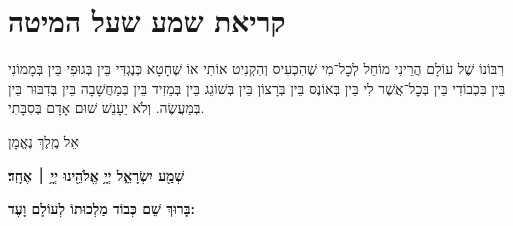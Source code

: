 \vspace{0.25in}
\chapter[ק״ש שעל המיטה]{ קריאת שמע שעל המיטה }

רִבּוֹנוֹ שֶׁל עוֹלָם הֲרֵינִי מוֹחֵל לְכׇל־מִי שֶׁהִכְעִיס וְהִקְנִיט אוֹתִי אוֹ שֶׁחָטָא כְּנֶגְדִּי בֵּין בְּגוּפִי בֵּין בְּמָמוֹנִי בֵּין בִּכְבוֹדִי בֵּין בְּכׇל־אֲשֶׁר לִי בֵּין בְּאוֹנֶס בֵּין בְּרָצוֹן בֵּין בְּשׁוֹגֵג בֵּין בְּמֵזִיד בֵּין בְּמַחֲשָׁבָה בֵּין בְּדִבּוּר בֵּין בְּמַעֲשֶׂה. וְלֹא יֵעָנֵשׁ שׁוּם אָדָם בְּסִבָּתִי.



\begin{footnotesize}%
	אֵל מֶֽלֶךְ נֶאֱמָן
\end{footnotesize}

\begin{Large}
	\textbf{
		שְׁמַ֖ע יִשְׂרָאֵ֑ל יְיָ֥ אֱלֹהֵ֖ינוּ יְיָ֥ ׀ אֶחָֽד׃} \\
\end{Large}
\begin{large}
	 \textbf{בָּרוּךְ שֵׁם כְּבוֹד מַלְכוּתוֹ לְעוֹלָם וָעֶד:}
\end{large}

\veahavta

\begin{footnotesize}
	\vehaya
	
	\vayomer{}
\end{footnotesize}


